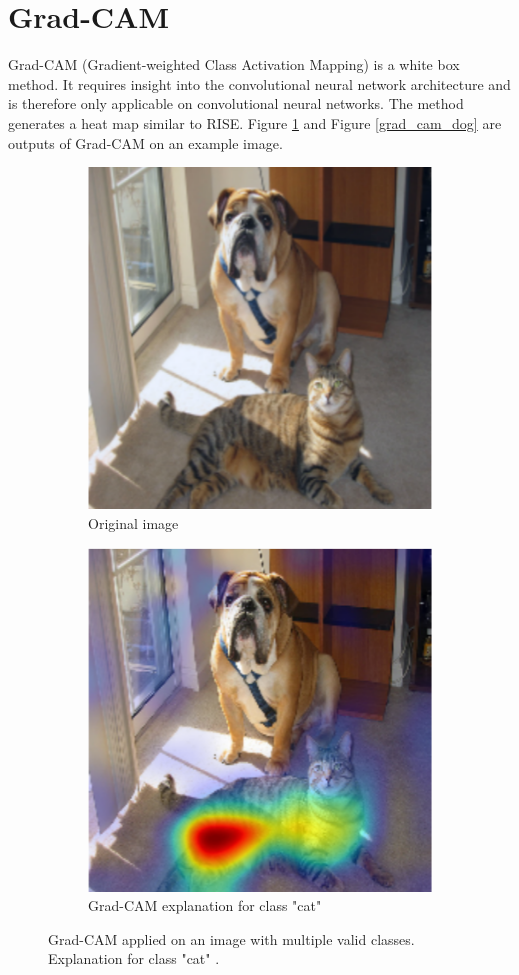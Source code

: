 \section{Grad-CAM}
Grad-CAM \cite{selvaraju2017grad} (Gradient-weighted Class Activation Mapping) is a white box method. It requires insight into the convolutional neural network architecture and is therefore only applicable on convolutional neural networks. The method generates a heat map similar to RISE. Figure \ref{grad_cam_cat} and Figure \ref{grad_cam_dog} are outputs of Grad-CAM on an example image.

\begin{figure}[H]
    \centering
    \begin{subfigure}{.5\textwidth}
        \centering
        \includegraphics[width=0.7\linewidth]{chapters/02_methods/images/grad-cam-original.png}
        \caption{Original image}
    \end{subfigure}\hfill%
    \begin{subfigure}{.5\textwidth}
        \centering
        \includegraphics[width=0.7\linewidth]{chapters/02_methods/images/grad-cam-cat.png}
        \caption{Grad-CAM explanation for class "cat"}
    \end{subfigure}
    \caption{Grad-CAM applied on an image with multiple valid classes. Explanation for class "cat" \cite{selvaraju2017grad}.}
    \label{grad_cam_cat}
\end{figure}

